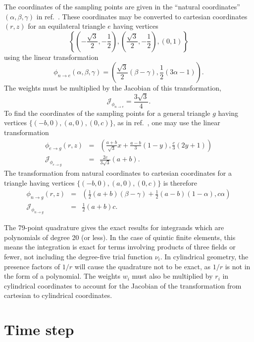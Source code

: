 \documentclass[draft]{book}
\begin{document}
The coordinates of the sampling points are given in the ``natural
coordinates'' $(\alpha, \beta, \gamma)$ in ref.~\cite{Dunavant85}.
These coordinates may be converted to cartesian coordinates $(r, z)$
for an equilateral triangle $e$ having vertices
\[
\left\{\left(-\frac{\sqrt{3}}{2},-\frac{1}{2}\right),
\left(\frac{\sqrt{3}}{2},-\frac{1}{2}\right), (0,1)\right\} 
\]
using the linear transformation
\[ 
\phi_{n \to e}(\alpha, \beta, \gamma) = 
\left(\frac{\sqrt{3}}{2}(\beta-\gamma), \frac{1}{2}(3 \alpha - 1)
\right).
\]
The weights must be multiplied by the Jacobian of this transformation,
\[
\mathcal{J}_{\phi_{n \to e}} = \frac{3 \sqrt{3}}{4}.
\]
To find the coordinates of the sampling points for a general triangle
$g$ having vertices $\{(-b,0), (a,0), (0,c)\}$, as in
ref.~\cite{Jardin04}, one may use the linear transformation
\begin{eqnarray*}
  \phi_{e \to g}(r,z) & = & 
    \left(\frac{a+b}{\sqrt{3}} x + \frac{a-b}{3} (1-y), 
    \frac{c}{3}(2y+1) \right) \\
  \mathcal{J}_{\phi_{e \to g}} & = &  \frac{2 c}{3 \sqrt{3}} (a+b).
\end{eqnarray*}
The transformation from natural coordinates to cartesian coordinates
for a triangle having vertices $\{(-b,0), (a,0), (0,c)\}$ is therefore
\begin{eqnarray*}
  \phi_{n \to g}(r,z) & = & 
  \left(\frac{1}{2} (a+b) (\beta-\gamma) +
  \frac{1}{2} (a-b)(1-\alpha), c \alpha \right) \\
  \mathcal{J}_{\phi_{n \to g}} & = & \frac{1}{2} (a+b) c.
\end{eqnarray*}

The 79-point quadrature gives the exact results for integrands which
are polynomials of degree 20 (or less).  In the case of quintic finite
elements, this means the integration is exact for terms involving
products of three fields or fewer, not including the degree-five
trial function $\nu_i$.  In cylindrical geometry, the presence factors
of $1/r$ will cause the quadrature not to be exact, as $1/r$ is not in
the form of a polynomial.  The weights $w_i$ must also be multiplied
by $r_i$ in cylindrical coordinates to account for the Jacobian of the
transformation from cartesian to cylindrical coordinates.



\section{Time step}
\end{document}
